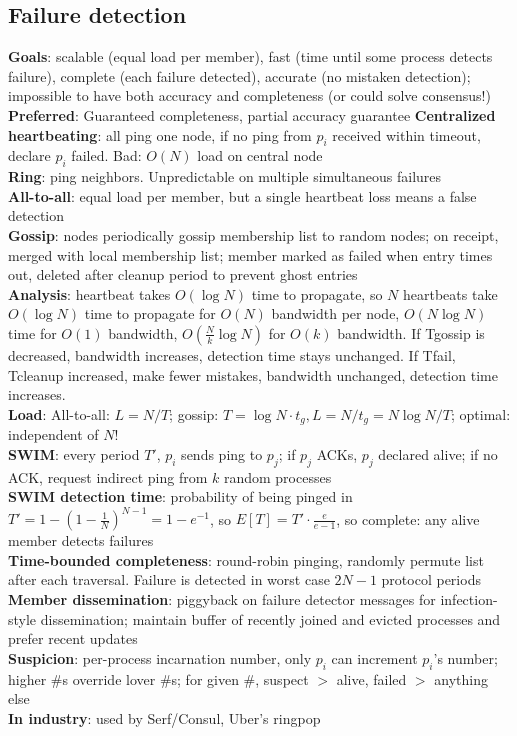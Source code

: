 \documentclass{article}
\begin{document}
\begin{multicols*}{3}
\section{Failure detection}
\textbf{Goals}: scalable (equal load per member), fast (time until some process detects failure), complete (each failure detected), accurate (no mistaken detection); impossible to have both accuracy and completeness (or could solve consensus!) \\
\textbf{Preferred}: Guaranteed completeness, partial accuracy guarantee
\textbf{Centralized heartbeating}: all ping one node, if no ping from $p_i$ received within timeout, declare $p_i$ failed. Bad: $O(N)$ load on central node \\
\textbf{Ring}: ping neighbors. Unpredictable on multiple simultaneous failures \\
\textbf{All-to-all}: equal load per member, but a single heartbeat loss means a false detection \\
\textbf{Gossip}: nodes periodically gossip membership list to random nodes; on receipt, merged with local membership list; member marked as failed when entry times out, deleted after cleanup period to prevent ghost entries \\
\textbf{Analysis}: heartbeat takes $O(\log{N})$ time to propagate, so $N$ heartbeats take $O(\log{N})$ time to propagate for $O(N)$ bandwidth per node, $O(N\log{N})$ time for $O(1)$ bandwidth, $O(\frac{N}{k}\log{N})$ for $O(k)$ bandwidth. If Tgossip is decreased, bandwidth increases, detection time stays unchanged. If Tfail, Tcleanup increased, make fewer mistakes, bandwidth unchanged, detection time increases. \\
\textbf{Load}: All-to-all: $L=N/T$; gossip: $T=\log{N}\cdot t_g, L=N/t_g=N\log{N}/T$; optimal: independent of $N$! \\
\textbf{SWIM}: every period $T\prime$, $p_i$ sends ping to $p_j$; if $p_j$ ACKs, $p_j$ declared alive; if no ACK, request indirect ping from $k$ random processes \\
\textbf{SWIM detection time}: probability of being pinged in $T\prime = 1-(1-\frac{1}{N})^{N-1}=1-e^{-1}$, so $E[T] = T\prime\cdot\frac{e}{e-1}$, so complete: any alive member detects failures \\
\textbf{Time-bounded completeness}: round-robin pinging, randomly permute list after each traversal. Failure is detected in worst case $2N-1$ protocol periods \\
\textbf{Member dissemination}: piggyback on failure detector messages for infection-style dissemination; maintain buffer of recently joined and evicted processes and prefer recent updates \\
\textbf{Suspicion}: per-process incarnation number, only $p_i$ can increment $p_i$'s number; higher \#s override lover \#s; for given \#, suspect $>$ alive, failed $>$ anything else \\
\textbf{In industry}: used by Serf/Consul, Uber's ringpop


\end{multicols*}
\end{document}
